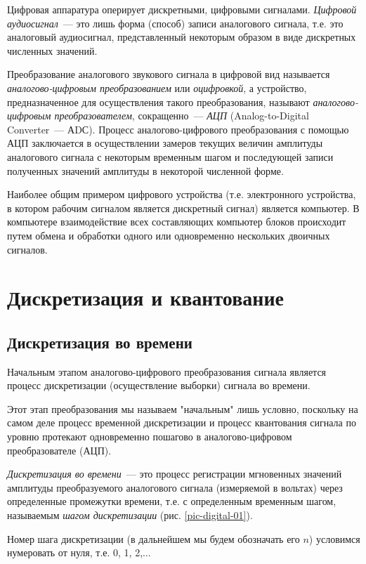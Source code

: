 \documentclass[oneside, final, 14pt]{extreport}
\begin{document}
Цифровая аппаратура оперирует дискретными, цифровыми сигналами. {\itshape Цифровой аудиосигнал}~--- это лишь форма (способ) записи аналогового сигнала, т.е. это аналоговый аудиосигнал, представленный некоторым образом в виде дискретных численных значений.

Преобразование аналогового звукового сигнала в цифровой вид называется {\itshape аналогово-цифровым преобразованием} или {\itshape оцифровкой}, а устройство, предназначенное для осуществления такого преобразования, называют {\itshape аналогово-цифровым преобразователем}, сокращенно~--- {\itshape АЦП} (Analog-to-Digital Converter~--- АDС). Процесс аналогово-цифрового преобразования с помощью АЦП заключается в осуществлении замеров текущих величин амплитуды аналогового сигнала с некоторым временным шагом и последующей записи полученных значений амплитуды в некоторой численной форме.

Наиболее общим примером цифрового устройства (т.е. электронного устройства, в котором рабочим сигналом является дискретный сигнал) является компьютер. В компьютере взаимодействие всех составляющих компьютер блоков происходит путем обмена и обработки одного или одновременно нескольких двоичных сигналов.

\section{Дискретизация и квантование}
\subsection{Дискретизация во времени}
Начальным этапом аналогово-цифрового преобразования сигнала является процесс дискретизации (осуществление выборки) сигнала во времени.

Этот этап преобразования мы называем "начальным" лишь условно, поскольку на самом деле процесс временной дискретизации и процесс квантования сигнала по уровню протекают одновременно пошагово в аналогово-цифровом преобразователе (АЦП).

\textit{Дискретизация во времени}~--- это процесс регистрации мгновенных значений амплитуды преобразуемого аналогового сигнала (измеряемой в вольтах) через определенные промежутки времени, т.е. с определенным временным шагом, называемым \textit{шагом дискретизации} (рис. \ref{pic-digital-01}). 

Номер шага дискретизации (в дальнейшем мы будем обозначать его $n$) условимся нумеровать от нуля, т.е. 0, 1, 2,...
\end{document}
